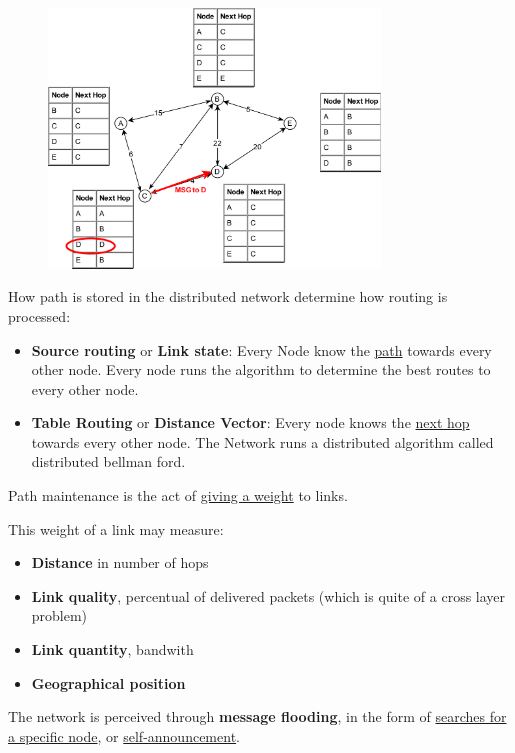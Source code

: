 \documentclass{article}
\begin{document}
\begin{figure}
  \includegraphics[width=250pt]{img/DV_routing_msg3.pdf}
\end{figure}

How path is stored in the distributed network determine how routing is processed:
\begin{itemize}
    \item \textbf{Source routing} or \textbf{Link state}:  
        Every Node know the \underline{path} towards every other node.
        Every node runs the algorithm  to determine the best routes to every other node.
    \item \textbf{Table Routing} or \textbf{Distance Vector}:
        Every node knows the \underline{next hop} towards every other node.
        The Network runs a distributed algorithm called distributed bellman ford.
\end{itemize}

Path maintenance is the act of \underline{giving a weight} to links.

This weight of a link may measure:
\begin{itemize}
    \item \textbf{Distance} in number of hops
    \item \textbf{Link quality}, percentual of delivered packets (which is quite of a cross layer problem)
    \item \textbf{Link quantity}, bandwith
    \item \textbf{Geographical position}

\end{itemize}


The network is perceived through \textbf{message flooding}, in the form of \underline{searches for a specific node}, or \underline{self-announcement}.
\end{document}
